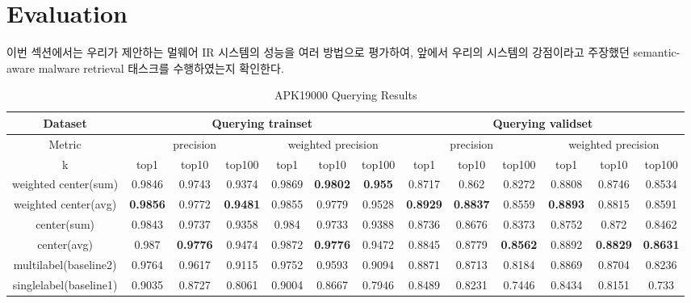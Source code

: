 \section{Evaluation}
이번 섹션에서는 우리가 제안하는 멀웨어 IR 시스템의 성능을 여러 방법으로 평가하여, 앞에서 우리의 시스템의 강점이라고 주장했던 semantic-aware malware retrieval 태스크를 수행하였는지 확인한다. 


\begin{table*}[!htb]%
\caption{APK19000 Querying Results}
\label{tab:apk_result}
\begin{minipage}{\textwidth}
\begin{center}
\begin{tabular}{|c|c|c|c|c|c|c|c|c|c|c|c|c|}
\hline
Dataset             & \multicolumn{6}{c|}{Querying trainset}                      & \multicolumn{6}{c|}{Querying validset}                      \\ \hline
Metric              & \multicolumn{3}{c|}{precision}  & \multicolumn{3}{c|}{weighted precision} & \multicolumn{3}{c|}{precision}  & \multicolumn{3}{c|}{weighted precision} \\ \hline
k              & top1   & top10  & top100 & top1      & top10     & top100   & top1   & top10  & top100 & top1      & top10     & top100   \\ \hline
weighted center(sum)  & 0.9846 & 0.9743 & 0.9374 & 0.9869    & \textbf{0.9802}   & \textbf{0.955}    & 0.8717 & 0.862  & 0.8272 & 0.8808    & 0.8746    & 0.8534   \\ \hline
weighted center(avg) & \textbf{0.9856} & 0.9772 & \textbf{0.9481} & 0.9855    & 0.9779    & 0.9528   & \textbf{0.8929 }& \textbf{0.8837 }& 0.8559 & \textbf{0.8893   } & 0.8815    & 0.8591   \\ \hline
center(sum)         & 0.9843 & 0.9737 & 0.9358 & 0.984     & 0.9733    & 0.9388   & 0.8736 & 0.8676 & 0.8373 & 0.8752    & 0.872     & 0.8462   \\ \hline
center(avg)        & 0.987  & \textbf{0.9776} & 0.9474 & 0.9872    & \textbf{0.9776}    & 0.9472   & 0.8845 & 0.8779 & \textbf{0.8562} & 0.8892    & \textbf{0.8829}    & \textbf{0.8631}   \\ \hline
multilabel(baseline2)               & 0.9764 & 0.9617 & 0.9115 & 0.9752    & 0.9593    & 0.9094   & 0.8871 & 0.8713 & 0.8184 & 0.8869    & 0.8704    & 0.8236   \\ \hline
singlelabel(baseline1)              & 0.9035 & 0.8727 & 0.8061 & 0.9004    & 0.8667    & 0.7946   & 0.8489 & 0.8231 & 0.7446 & 0.8434    & 0.8151    & 0.733    \\ \hline
\end{tabular}
\end{center}
\bigskip\centering
\end{minipage}
\end{table*}%



